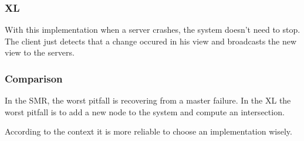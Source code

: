\documentclass[times, 10pt,twocolumn]{article}
\begin{document}
\subsubsection{XL}


With this implementation when a server crashes, the system doesn't need to stop. The client just detects that a change occured in his view
and broadcasts the new view to the servers.

\subsubsection{Comparison}


In the SMR, the worst pitfall is recovering from a master failure. In the XL the worst pitfall is to add a new node to the system and compute an intersection.

According to the context it is more reliable to choose an implementation wisely.



\end{document}
